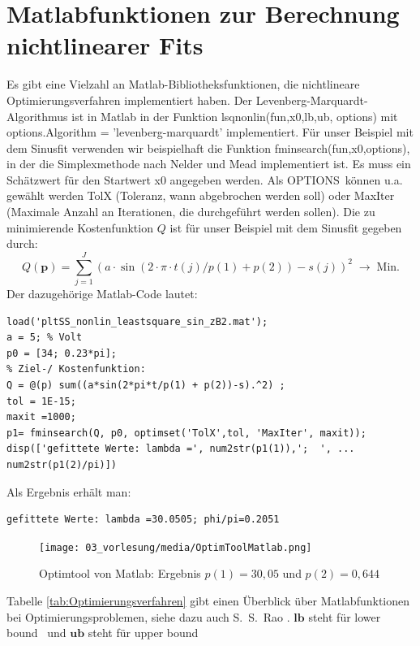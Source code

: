 \section{Matlabfunktionen zur Berechnung nichtlinearer Fits}
Es gibt eine Vielzahl an Matlab-Bibliotheksfunktionen, die nichtlineare Optimierungsverfahren implementiert haben. Der Levenberg-Marquardt-Algorithmus ist in Matlab in der Funktion \textsf{lsqnonlin(fun,x0,lb,ub, options)} mit
\textsf{options.Algorithm = 'levenberg-marquardt'} implementiert.
Für unser Beispiel mit dem Sinusfit verwenden wir beispielhaft die Funktion \textsf{fminsearch(fun,x0,options)}, in der die Simplexmethode nach Nelder und Mead implementiert ist. Es muss ein Schätzwert
für den Startwert \textrm{x0} angegeben werden. Als \glq OPTIONS\grq~können u.a. gewählt werden TolX (Toleranz, wann abgebrochen werden soll) oder MaxIter (Maximale Anzahl an Iterationen, die durchgeführt werden sollen).
Die zu minimierende Kostenfunktion $Q$ ist für unser Beispiel mit dem Sinusfit gegeben durch:
\begin{equation}
Q(\boldsymbol{p}) = \sum_{j=1}^{J} (a \cdot \sin(2\cdot \pi \cdot t(j) /p(1) + p(2))-s(j))^2
\;\rightarrow \;\textrm{Min.}
\end{equation}
Der dazugehörige Matlab-Code lautet:
\begin{verbatim}
load('pltSS_nonlin_leastsquare_sin_zB2.mat');
a = 5; % Volt
p0 = [34; 0.23*pi];
% Ziel-/ Kostenfunktion:
Q = @(p) sum((a*sin(2*pi*t/p(1) + p(2))-s).^2) ;
tol = 1E-15;
maxit =1000;
p1= fminsearch(Q, p0, optimset('TolX',tol, 'MaxIter', maxit));
disp(['gefittete Werte: lambda =', num2str(p1(1)),';  ', ...
num2str(p1(2)/pi)])
\end{verbatim}
Als Ergebnis erhält man:
\begin{verbatim}
gefittete Werte: lambda =30.0505; phi/pi=0.2051
\end{verbatim}
\begin{figure}[htb]
	\begin{center}
		\texttt{[image: 03\_vorlesung/media/OptimToolMatlab.png]}
	\end{center}
	\caption{Optimtool von Matlab: Ergebnis $p(1)=30,05$ und $p(2)=0,644$} \label{fig:Optimtool_von_Matlab}
\end{figure}

\newpage
Tabelle \ref*{tab:Optimierungsverfahren} gibt einen Überblick über
Matlabfunktionen bei Optimierungsproblemen, siehe dazu auch
S.~S.~Rao \cite{Rao09}. $\mathbf{lb}$ steht für \glq lower bound\grq~ und $\mathbf{ub}$ steht für \glq upper bound\grq~

